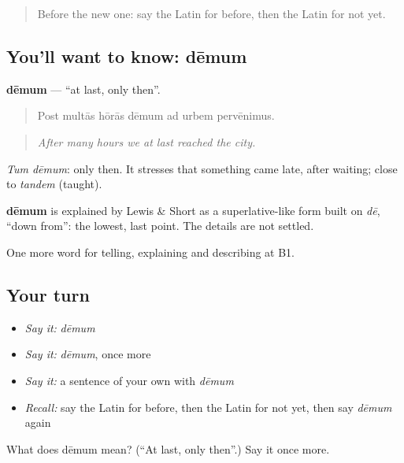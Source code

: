 \label{lesson:LA-C291-demum}



\begin{quote}
Before the new one: say the Latin for before, then the Latin for not yet.
\end{quote}

\subsection*{You'll want to know: dēmum}
\textbf{dēmum} — \textquotedblleft{}at last, only then\textquotedblright{}.

\begin{quote}
Post multās hōrās dēmum ad urbem pervēnimus.
\end{quote}

\begin{quote}
\emph{After many hours we at last reached the city.}
\end{quote}

\emph{Tum dēmum}: only then. It stresses that something came late, after waiting; close to \emph{tandem} (taught).

\begin{cousinweb}
\textbf{dēmum} is explained by Lewis \& Short as a superlative-like form built on \emph{dē}, \textquotedblleft{}down from\textquotedblright{}: the lowest, last point. The details are not settled.
\end{cousinweb}

\begin{grammarlens}[title={What you've built}]
One more word for telling, explaining and describing at B1.
\end{grammarlens}

\subsection*{Your turn}
\begin{itemize}
\raggedright
  \item \emph{Say it:} \emph{dēmum}
  \item \emph{Say it:} \emph{dēmum}, once more
  \item \emph{Say it:} a sentence of your own with \emph{dēmum}
  \item \emph{Recall:} say the Latin for before, then the Latin for not yet, then say \emph{dēmum} again
\end{itemize}

\begin{tcolorbox}[breakable,colback=teal!4,colframe=teal!35!black,title={Before you move on}]
What does dēmum mean? (\textquotedblleft{}At last, only then\textquotedblright{}.) Say it once more.
\end{tcolorbox}
